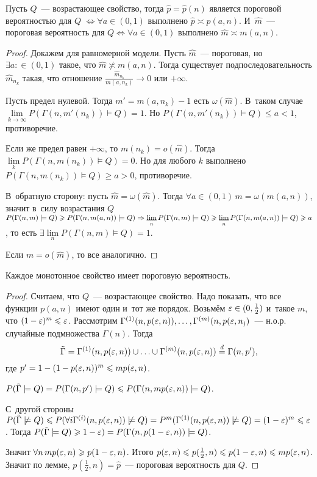\documentclass{article}
\begin{document}
\begin{lemma}
	Пусть $Q$~--- возрастающее свойство, тогда $\hat{p} = \hat{p}(n)$ является
	пороговой вероятностью для $Q$ $\Leftrightarrow \forall a \in
	(0, 1)$ выполнено $\hat{p} \asymp p(a, n)$. И~$\hat{m}$~--- пороговая
	вероятность для $Q \Leftrightarrow \forall a \in (0, 1)$ выполнено $\hat{m}
	\asymp m(a, n)$.
\end{lemma}
\begin{proof}
	Докажем для равномерной модели. Пусть $\hat{m}$~--- пороговая, но $\exists a:
	\in (0, 1)$ такое, что $\hat{m} \not\asymp m(a, n)$. Тогда существует
	подпоследовательность $\hat{m}_{n_k}$ такая, что отношение
	$\frac{\hat{m}_{n_k}}{m(a, n_k)} \rightarrow 0$ или $+\infty$.

	Пусть предел нулевой. Тогда $m' = m(a, n_k) - 1$ есть $\omega(\hat{m})$.
	В~таком случае $\lim\limits_{k\rightarrow\infty} P(\Gamma(n, m'(n_k)) \models
	Q) = 1$.  Но $P(\Gamma(n, m'(n_k)) \models Q) \le a < 1$, противоречие.

	Если же предел равен $+\infty$, то $m(n_k) = o(\hat{m})$. Тогда
	$\lim\limits_k P(\Gamma(n, m(n_k)) \models Q) = 0$. Но для любого $k$
	выполнено $P(\Gamma(n, m(n_k)) \models Q) \ge a > 0$, противоречие.

	В~обратную сторону: пусть $\hat m = \omega(\hat{m})$. Тогда $\forall a \in (0,
	1) \,m = \omega(m(a, n))$, значит в~силу возрастания $Q$
	$P(\Gamma(n, m) \models Q) \geqslant P(\Gamma(n, m(a, n)) \models
	Q) \Rightarrow \operatorname*{\underline{lim}}\limits_n P(\Gamma(n, m) \models Q) \geqslant \operatorname*{\underline{lim}}\limits_n
	P(\Gamma(n, m(a, n)) \models Q) \geqslant a$, то есть $\exists \lim\limits_n
	P(\Gamma(n, m) \models Q) = 1$.

	Если $m = o(\hat{m})$, то все аналогично.
\end{proof}

\begin{theorem}
	Каждое монотонное свойство имеет пороговую вероятность.
\end{theorem}
\begin{proof}
	Считаем, что $Q$~--- возрастающее свойство. Надо показать, что все функции
	$p(a, n)$ имеют один и~тот же порядок. Возьмём $\varepsilon \in (0, \frac{1}{2})$
	и~такое $m$, что $(1 - \varepsilon)^m \leqslant \varepsilon$. Рассмотрим $\Gamma^{(1)}(n, p(\varepsilon,
	n)), \ldots, \Gamma^{(m)}(n, p(\varepsilon, n_))$~--- н.о.р. случайные подмножества
	$\Gamma(n)$. Тогда
	$$\tilde\Gamma = \Gamma^{(1)}(n, p(\varepsilon, n)) \cup \ldots \cup
	\Gamma^{(m)}(n, p(\varepsilon, n)) \overset{d}= \Gamma(n, p'),$$
	где $p' = 1 - (1 - p(\varepsilon, n))^m \leqslant m p(\varepsilon, n)$.

	$P(\tilde\Gamma \models Q) = P(\Gamma(n, p') \models Q) \leqslant P(\Gamma(n,
	mp(\varepsilon, n)) \models Q)$.

	С~другой стороны $P(\tilde\Gamma \not\models Q) \leqslant P(\forall i \Gamma^{(i)}(n,
	p(\varepsilon, n)) \not\models Q) = P^m(\Gamma^{(1)}(n, p(\varepsilon, n)) \not\models Q) =
	(1 - \varepsilon)^m \leqslant \varepsilon$. Тогда $P(\tilde\Gamma \models Q) \geqslant 1 - \varepsilon) =
	P(\Gamma(n, p(1 - \varepsilon, n)) \models Q)$.

	Значит $\forall n\, mp(\varepsilon, n) \geqslant p(1 - \varepsilon, n)$. Итого $p(\varepsilon, n) \leqslant
	p(\frac{1}{2}, n) \leqslant p(1 - \varepsilon, n) \leqslant mp(\varepsilon, n)$. Значит по лемме,
	$p(\frac{1}{2}, n) = \hat{p}$~--- пороговая вероятность для $Q$.
\end{proof}
\end{document}
